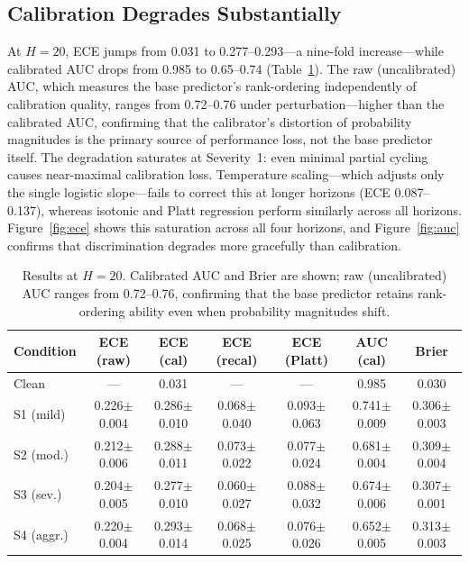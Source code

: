 \documentclass[11pt,a4paper]{article}
\begin{document}
\subsection{Calibration Degrades Substantially}

At \(H=20\), ECE jumps from 0.031 to 0.277--0.293---a nine-fold increase---while calibrated AUC drops from 0.985 to 0.65--0.74 (Table~\ref{tab:h20}). The raw (uncalibrated) AUC, which measures the base predictor's rank-ordering independently of calibration quality, ranges from 0.72--0.76 under perturbation---higher than the calibrated AUC, confirming that the calibrator's distortion of probability magnitudes is the primary source of performance loss, not the base predictor itself. The degradation saturates at Severity~1: even minimal partial cycling causes near-maximal calibration loss. Temperature scaling---which adjusts only the single logistic slope---fails to correct this at longer horizons (ECE 0.087--0.137), whereas isotonic and Platt regression perform similarly across all horizons. Figure~\ref{fig:ece} shows this saturation across all four horizons, and Figure~\ref{fig:auc} confirms that discrimination degrades more gracefully than calibration.

\begin{table}[htbp]
\centering
\caption{Results at \(H=20\). Calibrated AUC and Brier are shown; raw (uncalibrated) AUC ranges from 0.72--0.76, confirming that the base predictor retains rank-ordering ability even when probability magnitudes shift.}
\label{tab:h20}
\small
\begin{tabular}{@{}lcccccc@{}}
\toprule
Condition & ECE (raw) & ECE (cal) & ECE (recal) & ECE (Platt) & AUC (cal) & Brier \\
\midrule
Clean & --- & 0.031 & --- & --- & 0.985 & 0.030 \\
S1 (mild) & 0.226$\pm$0.004 & 0.286$\pm$0.010 & 0.068$\pm$0.040 & 0.093$\pm$0.063 & 0.741$\pm$0.009 & 0.306$\pm$0.003 \\
S2 (mod.) & 0.212$\pm$0.006 & 0.288$\pm$0.011 & 0.073$\pm$0.022 & 0.077$\pm$0.024 & 0.681$\pm$0.004 & 0.309$\pm$0.004 \\
S3 (sev.) & 0.204$\pm$0.005 & 0.277$\pm$0.010 & 0.060$\pm$0.027 & 0.088$\pm$0.032 & 0.674$\pm$0.006 & 0.307$\pm$0.001 \\
S4 (aggr.) & 0.220$\pm$0.004 & 0.293$\pm$0.014 & 0.068$\pm$0.025 & 0.076$\pm$0.026 & 0.652$\pm$0.005 & 0.313$\pm$0.003 \\
\bottomrule
\end{tabular}
\end{table}
\end{document}
